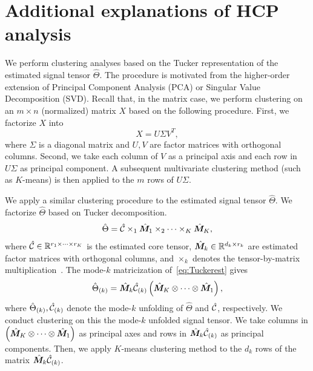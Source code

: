 \documentclass{article}
\theoremstyle{plain}
\theoremstyle{definition}
\begin{document}
\section{Additional explanations of HCP analysis}\label{sec:additionalHCP}
We perform clustering analyses based on the Tucker representation of the estimated signal tensor $\hat\Theta$. The procedure is motivated from the higher-order extension of Principal Component Analysis (PCA) or Singular Value Decomposition (SVD). Recall that, in the matrix case, we perform clustering on an $m\times n$ (normalized) matrix $X$ based on the following procedure. First, we factorize $X$ into
\begin{equation}
X = U\Sigma V^T,
\end{equation}
where $\Sigma$ is a diagonal matrix and $ U,V$ are factor matrices with orthogonal columns. Second, we take each column of $V$ as a principal axis and each row in $U\Sigma$ as principal component. A subsequent multivariate clustering method (such as $K$-means) is then applied to the $m$ rows of $U\Sigma$.


We apply a similar clustering procedure to the estimated signal tensor $\hat\Theta$. We factorize $\hat \Theta$ based on Tucker decomposition.
\begin{equation}\label{eq:Tuckerest}
\hat \Theta = \hat {\mathcal{C}}\times_1\hat {\bm M}_1\times_2\cdots\times_K\hat {\bm M}_K,
\end{equation}
where $\hat {\mathcal{C}}\in\mathbb{R}^{r_1\times \cdots \times r_K}$ is the estimated core tensor, $\hat {\bm M}_k\in\mathbb{R}^{d_k\times r_k}$ are estimated factor matrices with orthogonal columns, and $\times_k$ denotes the tensor-by-matrix multiplication~\citep{kolda2009tensor}. The mode-$k$ matricization of~\eqref{eq:Tuckerest} gives
\begin{equation}
\hat \Theta_{(k)} = \hat {\bm M}_k\hat {\mathcal{C}}_{(k)}\left(\hat {\bm M}_K\otimes\cdots\otimes\hat {\bm M}_1\right),
\end{equation}
where $\hat \Theta_{(k)} , \hat {\mathcal{C}}_{(k)}$ denote the mode-$k$ unfolding of $\hat \Theta$ and $\hat {\mathcal{C}}$, respectively. We conduct clustering on this  the mode-$k$ unfolded signal tensor. We take columns in $\left(\hat {\bm M}_K\otimes\cdots\otimes\hat {\bm M}_1\right)$ as principal axes and rows in $\hat {\bm M}_k\hat {\mathcal{C}}_{(k)}$ as principal components. Then, we apply $K$-means clustering method to the $d_k$ rows of the matrix $\hat {\bm M}_k\hat {\mathcal{C}}_{(k)}$.
\end{document}
